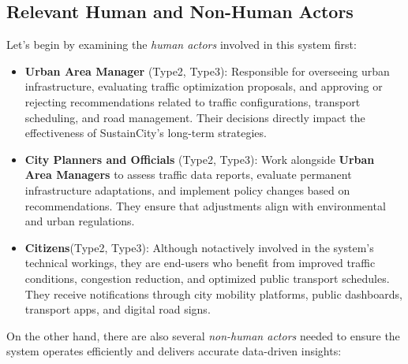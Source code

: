 \documentclass[a4paper,12pt]{article}
\begin{document}
\subsection{Relevant Human and Non-Human Actors}
Let's begin by examining the \textit{human actors} involved in this system first:
\begin{itemize}
    \item \textbf{Urban Area Manager} (Type2, Type3): Responsible for overseeing urban infrastructure, evaluating traffic optimization proposals, and approving or rejecting recommendations related to traffic configurations, transport scheduling, and road management. Their decisions directly impact the effectiveness of SustainCity’s long-term strategies.
    \item \textbf{City Planners and Officials} (Type2, Type3): Work alongside \textbf{Urban Area Managers} to assess traffic data reports, evaluate permanent infrastructure adaptations, and implement policy changes based on recommendations. They ensure that adjustments align with environmental and urban regulations.
    \item \textbf{Citizens}(Type2, Type3): Although notactively involved in the system’s technical workings, they are end-users who benefit from improved traffic conditions, congestion reduction, and optimized public transport schedules. They receive notifications through city mobility platforms, public dashboards, transport apps, and digital road signs.
\end{itemize}
\noindent On the other hand, there are also several \textit{non-human actors} needed to ensure the system operates efficiently and delivers accurate data-driven insights:
\end{document}
